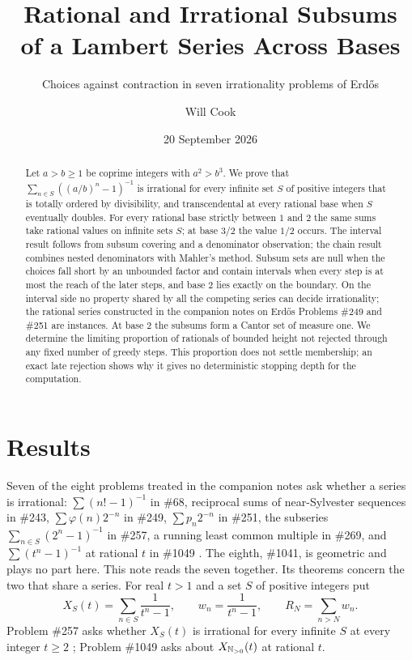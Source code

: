 \documentclass[11pt]{article}
\title{Rational and Irrational Subsums\\of a Lambert Series Across Bases}
\subtitle{Choices against contraction in seven irrationality problems of Erd\H{o}s}
\author{Will Cook}
\date{20 September 2026}
\begin{document}
\maketitle
\noteprovenance

\begin{abstract}
Let $a>b\ge1$ be coprime integers with $a^2>b^3$.  We prove that
$\sum_{n\in S}((a/b)^n-1)^{-1}$ is irrational for every infinite set $S$ of
positive integers that is totally ordered by divisibility, and transcendental
at every rational base when $S$ eventually doubles.  For every rational base
strictly between $1$ and $2$ the same sums take rational values on infinite
sets $S$; at base $3/2$ the value $1/2$ occurs.  The interval result follows
from subsum covering and a denominator observation; the chain result combines
nested denominators with Mahler's method.  Subsum sets are null when the choices fall short
by an unbounded factor and contain intervals when every step is at most the
reach of the later steps, and base $2$ lies exactly on the boundary.  On the
interval side no property shared by all the competing series can decide
irrationality; the rational series constructed in the companion notes on
Erd\H{o}s Problems \#249 and \#251 are instances.  At base $2$ the subsums form
a Cantor set of measure one.  We determine the limiting proportion of rationals
of bounded height not rejected through any fixed number of greedy steps.
This proportion does not settle membership; an exact late rejection shows
why it gives no deterministic stopping depth for the computation.
\end{abstract}

\section{Results}\label{sec:results}

Seven of the eight problems treated in the companion notes ask whether a
series is irrational: $\sum(n!-1)^{-1}$ in \#68, reciprocal sums of
near-Sylvester sequences in \#243, $\sum\varphi(n)2^{-n}$ in \#249,
$\sum p_n2^{-n}$ in \#251, the subseries $\sum_{n\in S}(2^n-1)^{-1}$ in \#257,
a running least common multiple in \#269, and $\sum(t^n-1)^{-1}$ at rational
$t$ in \#1049 \cite{erdosgraham1980,erdos1988}.  The eighth, \#1041, is
geometric and plays no part here.  This note reads the seven together.  Its
theorems concern the two that share a series.  For real $t>1$ and a set $S$ of
positive integers put
\[
 X_S(t)=\sum_{n\in S}\frac{1}{t^n-1},\qquad
 w_n=\frac{1}{t^n-1},\qquad R_N=\sum_{n>N}w_n .
\]
Problem \#257 asks whether $X_S(t)$ is irrational for every infinite $S$ at
every integer $t\ge2$ \cite[p.~62]{erdosgraham1980}; Problem \#1049 asks about
$X_{\mathbb{N}_{>0}}(t)$ at rational $t$.
\end{document}
